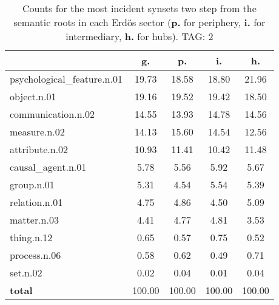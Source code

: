 \begin{table}[h!]
\begin{center}
\begin{tabular}{| l || c | c | c | c |}\hline
 & {\bf g.} & {\bf p.} & {\bf i.} & {\bf h.} \\\hline\hline
psychological\_feature.n.01 & 19.73  & 18.58  & 18.80  & 21.96 \\\hline
object.n.01 & 19.16  & 19.52  & 19.42  & 18.50 \\\hline
communication.n.02 & 14.55  & 13.93  & 14.78  & 14.56 \\\hline
measure.n.02 & 14.13  & 15.60  & 14.54  & 12.56 \\\hline
attribute.n.02 & 10.93  & 11.41  & 10.42  & 11.48 \\\hline
causal\_agent.n.01 & 5.78  & 5.56  & 5.92  & 5.67 \\\hline
group.n.01 & 5.31  & 4.54  & 5.54  & 5.39 \\\hline
relation.n.01 & 4.75  & 4.86  & 4.50  & 5.09 \\\hline
matter.n.03 & 4.41  & 4.77  & 4.81  & 3.53 \\\hline
thing.n.12 & 0.65  & 0.57  & 0.75  & 0.52 \\\hline
process.n.06 & 0.58  & 0.62  & 0.49  & 0.71 \\\hline
set.n.02 & 0.02  & 0.04  & 0.01  & 0.04 \\\hline\hline
{{\bf total}} & 100.00  & 100.00  & 100.00  & 100.00 \\\hline
\end{tabular}
\caption{Counts for the most incident synsets two step from the semantic roots in each Erd\"os sector ({\bf p.} for periphery, {\bf i.} for intermediary, {\bf h.} for hubs). TAG: 2}
\end{center}
\end{table}